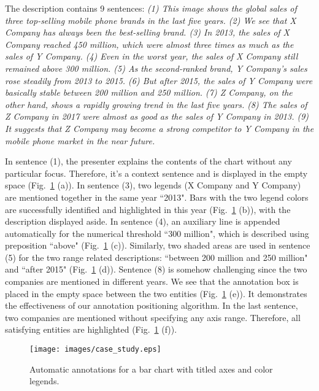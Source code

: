 \documentclass{vgtc}                          %
\begin{document}
The description contains 9 sentences: \emph{(1) This image shows the global sales of three top-selling mobile phone brands in the last five years. (2) We see that X Company has always been the best-selling brand. (3) In 2013, the sales of X Company reached 450 million, which were almost three times as much as the sales of Y Company. (4) Even in the worst year, the sales of X Company still remained above 300 million. (5) As the second-ranked brand, Y Company's sales rose steadily from 2013 to 2015. (6) But after 2015, the sales of Y Company were basically stable between 200 million and 250 million. (7) Z Company, on the other hand, shows a rapidly growing trend in the last five years. (8) The sales of Z Company in 2017 were almost as good as the sales of Y Company in 2013. (9) It suggests that Z Company may become a strong competitor to Y Company in the mobile phone market in the near future.}

In sentence (1), the presenter explains the contents of the chart without any particular focus. Therefore, it's a context sentence and is displayed in the empty space (Fig.~\ref{fig:case_study_bar} (a)). In sentence (3), two legends (X Company and Y Company) are mentioned together in the same year ``2013". Bars with the two legend colors are successfully identified and highlighted in this year (Fig.~\ref{fig:case_study_bar} (b)), with the description displayed aside. In sentence (4), an auxiliary line is appended automatically for the numerical threshold ``300 million", which is described using preposition ``above" (Fig.~\ref{fig:case_study_bar} (c)). Similarly, two shaded areas are used in sentence (5) for the two range related descriptions: ``between 200 million and 250 million" and ``after 2015" (Fig.~\ref{fig:case_study_bar} (d)). Sentence (8) is somehow challenging since the two companies are mentioned in different years. We see that the annotation box is placed in the empty space between the two entities (Fig.~\ref{fig:case_study_bar} (e)). It demonstrates the effectiveness of our annotation positioning algorithm. In the last sentence, two companies are mentioned without specifying any axis range. Therefore, all satisfying entities are highlighted (Fig.~\ref{fig:case_study_bar} (f)).

 \begin{figure}[t]
 \texttt{[image: images/case\_study.eps]}
  \caption{Automatic annotations for a bar chart with titled axes and color legends.}
  \label{fig:case_study_bar}
\end{figure}
\end{document}
